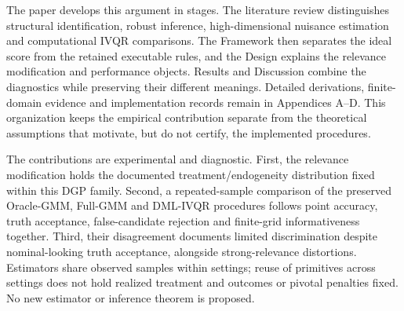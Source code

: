 The paper develops this argument in stages. The literature review distinguishes structural identification, robust inference, high-dimensional nuisance estimation and computational IVQR comparisons. The Framework then separates the ideal score from the retained executable rules, and the Design explains the relevance modification and performance objects. Results and Discussion combine the diagnostics while preserving their different meanings. Detailed derivations, finite-domain evidence and implementation records remain in Appendices A--D. This organization keeps the empirical contribution separate from the theoretical assumptions that motivate, but do not certify, the implemented procedures.

The contributions are experimental and diagnostic. First, the relevance modification holds the documented treatment/endogeneity distribution fixed within this DGP family. Second, a repeated-sample comparison of the preserved Oracle-GMM, Full-GMM and DML-IVQR procedures follows point accuracy, truth acceptance, false-candidate rejection and finite-grid informativeness together. Third, their disagreement documents limited discrimination despite nominal-looking truth acceptance, alongside strong-relevance distortions. Estimators share observed samples within settings; reuse of primitives across settings does not hold realized treatment and outcomes or pivotal penalties fixed. No new estimator or inference theorem is proposed.
